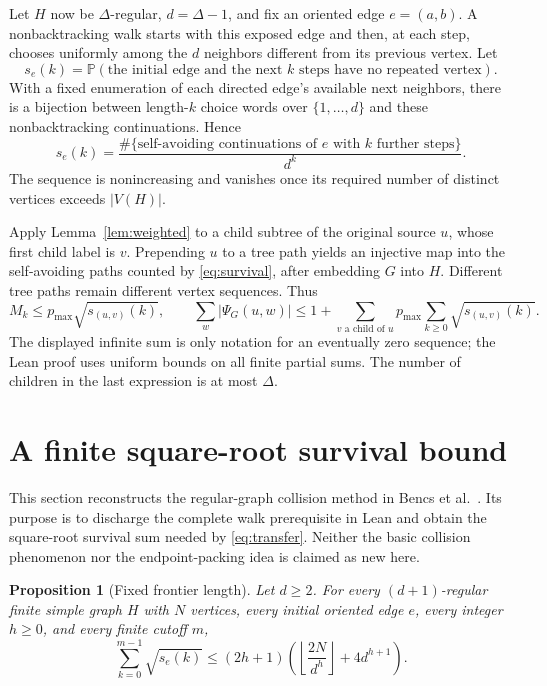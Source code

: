 \documentclass[11pt]{article}
\newtheorem{proposition}[theorem]{Proposition}
\theoremstyle{definition}
\newcommand{\Prb}{\mathbb P}
\begin{document}
Let $H$ now be $\Delta$-regular, $d=\Delta-1$, and fix an oriented edge
$e=(a,b)$. A nonbacktracking walk starts with this exposed edge and then,
at each step, chooses uniformly among the $d$ neighbors different from
its previous vertex. Let
\[
 s_e(k)=\Prb(\text{the initial edge and the next $k$ steps have no repeated vertex}).
\]
With a fixed enumeration of each directed edge's available next neighbors,
there is a bijection between length-$k$ choice words over $\{1,\ldots,d\}$
and these nonbacktracking continuations. Hence
\begin{equation}\label{eq:survival}
 s_e(k)=\frac{\#\{\text{self-avoiding continuations of $e$ with $k$ further steps}\}}{d^k}.
\end{equation}
The sequence is nonincreasing and vanishes once its required number of
distinct vertices exceeds $|V(H)|$.

Apply Lemma~\ref{lem:weighted} to a child subtree of the original source
$u$, whose first child label is $v$. Prepending $u$ to a tree path yields
an injective map into the self-avoiding paths counted by
\eqref{eq:survival}, after embedding $G$ into $H$. Different tree paths
remain different vertex sequences. Thus
\begin{equation}\label{eq:transfer}
 M_k\le p_{\max}\sqrt{s_{(u,v)}(k)},\qquad
 \sum_w|\Psi_G(u,w)|
 \le 1+\sum_{v\text{ a child of }u}p_{\max}\sum_{k\ge0}\sqrt{s_{(u,v)}(k)}.
\end{equation}
The displayed infinite sum is only notation for an eventually zero sequence;
the Lean proof uses uniform bounds on all finite partial sums. The number
of children in the last expression is at most $\Delta$.

\section{A finite square-root survival bound}

This section reconstructs the regular-graph collision method in
Bencs et al.\ \cite{Bencs}. Its purpose is to discharge the complete
walk prerequisite in Lean and obtain the square-root survival sum needed
by \eqref{eq:transfer}. Neither the basic collision phenomenon nor the
endpoint-packing idea is claimed as new here.

\begin{proposition}[Fixed frontier length]\label{prop:collision}
Let $d\ge2$. For every $(d+1)$-regular finite simple graph $H$ with $N$ vertices,
every initial oriented edge $e$, every integer $h\ge0$, and every finite
cutoff $m$,
\begin{equation}\label{eq:collision}
 \sum_{k=0}^{m-1}\sqrt{s_e(k)}
 \le (2h+1)\left(\left\lfloor\frac{2N}{d^h}\right\rfloor+4d^{h+1}\right).
\end{equation}
\end{proposition}
\end{document}
